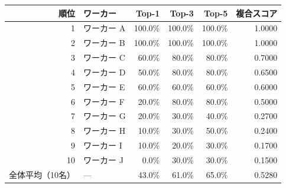 \begin{tabular}{r l r r r r}
\hline
順位 & ワーカー & Top-1 & Top-3 & Top-5 & 複合スコア \\
\hline
1  & ワーカー A & 100.0\% & 100.0\% & 100.0\% & 1.0000 \\
2  & ワーカー B & 100.0\% & 100.0\% & 100.0\% & 1.0000 \\
3  & ワーカー C & 60.0\%  & 80.0\%  & 80.0\%  & 0.7000 \\
4  & ワーカー D & 50.0\%  & 80.0\%  & 80.0\%  & 0.6500 \\
5  & ワーカー E & 60.0\%  & 60.0\%  & 60.0\%  & 0.6000 \\
6  & ワーカー F & 20.0\%  & 80.0\%  & 80.0\%  & 0.5000 \\
7  & ワーカー G & 20.0\%  & 30.0\%  & 40.0\%  & 0.2700 \\
8  & ワーカー H & 10.0\%  & 30.0\%  & 50.0\%  & 0.2400 \\
9  & ワーカー I & 10.0\%  & 20.0\%  & 30.0\%  & 0.1700 \\
10 & ワーカー J & 0.0\%   & 30.0\%  & 30.0\%  & 0.1500 \\
\hline
全体平均（10名） & --- & 43.0\% & 61.0\% & 65.0\% & 0.5280 \\
\hline
\end{tabular}
